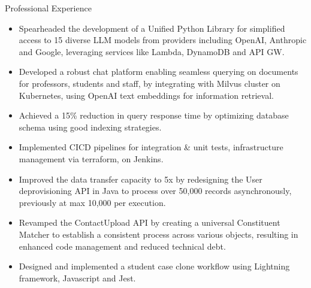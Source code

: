 \documentclass{resume}
\begin{document}
\begin{experienceSection}{Professional Experience}
    \experienceItem[
        company={Technology at Arizona State University},
        location={Tempe, AZ},
        position={AI Full Stack ENgineer (Part-time)},
        duration={Dec 2023 - present}
    ]
    \begin{itemize}
        \itemsep -6pt {}
        \item Spearheaded the development of a Unified Python Library for simplified access to 15 diverse LLM models from providers including OpenAI, Anthropic and Google, leveraging services like Lambda, DynamoDB and API GW.
        \item Developed a robust chat platform enabling seamless querying on documents for professors, students and staff, by integrating with Milvus cluster on Kubernetes, using OpenAI text embeddings for information retrieval.
        \item Achieved a 15\% reduction in query response time by optimizing database schema using good indexing strategies.
        \item Implemented CICD pipelines for integration \& unit tests, infrastructure management via terraform, on Jenkins.
    \end{itemize}

    \experienceItem[
        company={Technology at Arizona State University},
        location={Tempe, AZ},
        position={Software Developer (Part-time)},
        duration={Mar 2023 - Dec 2023}
    ]
    \begin{itemize}
        \itemsep -6pt {}
        \item Improved the data transfer capacity to 5x by redesigning the User deprovisioning API in Java to process over 50,000 records asynchronously, previously at max 10,000 per execution.
        \item Revamped the ContactUpload API by creating a universal Constituent Matcher to establish a consistent process across various objects, resulting in enhanced code management and reduced technical debt.
        \item Designed and implemented a student case clone workflow using Lightning framework, Javascript and Jest.
    \end{itemize}


\end{experienceSection}
\end{document}
